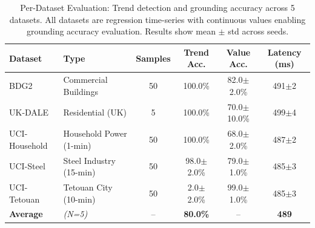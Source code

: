 
\begin{table}[t]
\centering
\caption{Per-Dataset Evaluation: Trend detection and grounding accuracy across 5 datasets.
All datasets are regression time-series with continuous values enabling grounding accuracy evaluation.
Results show mean $\pm$ std across seeds.}
\label{tab:per_dataset}
\begin{tabular}{l l c c c c}
\toprule
\textbf{Dataset} & \textbf{Type} & \textbf{Samples} & \textbf{Trend Acc.} & \textbf{Value Acc.} & \textbf{Latency (ms)} \\
\midrule
BDG2 & Commercial Buildings & 50 & 100.0\% & 82.0$\pm$2.0\% & 491$\pm$2 \\
UK-DALE & Residential (UK) & 5 & 100.0\% & 70.0$\pm$10.0\% & 499$\pm$4 \\
UCI-Household & Household Power (1-min) & 50 & 100.0\% & 68.0$\pm$2.0\% & 487$\pm$2 \\
UCI-Steel & Steel Industry (15-min) & 50 & 98.0$\pm$2.0\% & 79.0$\pm$1.0\% & 485$\pm$3 \\
UCI-Tetouan & Tetouan City (10-min) & 50 & 2.0$\pm$2.0\% & 99.0$\pm$1.0\% & 485$\pm$3 \\
\midrule
\textbf{Average} & \textit{(N=5)} & -- & \textbf{80.0\%} & -- & \textbf{489} \\

\bottomrule
\end{tabular}
\end{table}
